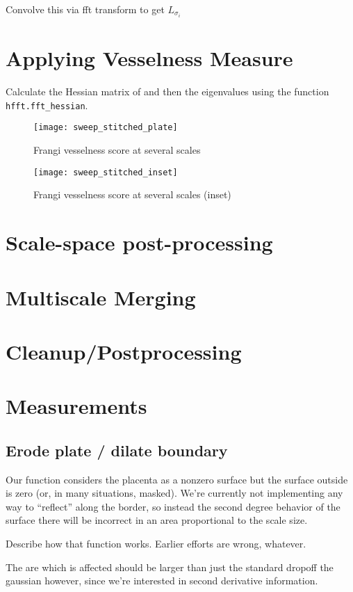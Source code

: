 	
	
	
	
	Convolve this via fft transform to get $L_{\sigma_i}$
	

\section{Applying Vesselness Measure}
Calculate the Hessian matrix of  and then the eigenvalues using the function \texttt{hfft.fft\_hessian}.

\begin{figure}
	\texttt{[image: sweep\_stitched\_plate]}
	\caption{Frangi vesselness score at several scales}
\end{figure}
\begin{figure}
	\texttt{[image: sweep\_stitched\_inset]}
	\caption{Frangi vesselness score at several scales (inset)}
\end{figure}
\section{Scale-space post-processing}
\section{Multiscale Merging}
\section{Cleanup/Postprocessing}
\section{Measurements}

	\subsection{Erode plate / dilate boundary}
	
	Our function considers the placenta as a nonzero surface but the surface outside is zero (or, in many situations, masked). We're currently not implementing any way to ``reflect'' along the border, so instead the second degree behavior of the surface there will be incorrect in an area proportional to the scale size.
	
	Describe how that function works. Earlier efforts are wrong, whatever.
	
	The are which is affected should be larger than just the standard dropoff the gaussian however, since we're interested
	in second derivative information.
